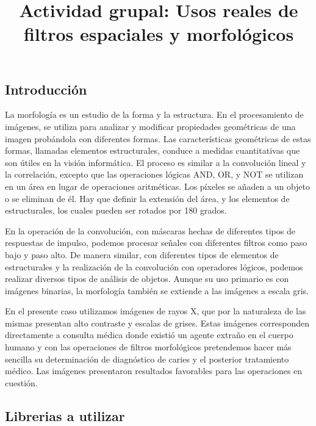 \documentclass[11pt,a4paper,table]{article}
\title{Actividad grupal: Usos reales de filtros espaciales y morfológicos}
\makeatletter
\let\newtitle\@title
\makeatother
\begin{document}
    
    
    
    
    \hypertarget{actividad-grupal-usos-reales-de-filtros-espaciales-y-morfoluxf3gicos}{%
\textcolor{UnirDark}{\Large\bfseries\newtitle}\label{actividad-grupal-usos-reales-de-filtros-espaciales-y-morfoluxf3gicos}}

\hypertarget{introducciuxf3n}{%
\subsection*{Introducción}\label{introducciuxf3n}}

La morfología es un estudio de la forma y la estructura. En el
procesamiento de imágenes, se utiliza para analizar y modificar
propiedades geométricas de una imagen probándola con diferentes formas.
Las características geométricas de estas formas, llamadas elementos
estructurales, conduce a medidas cuantitativas que son útiles en la
visión informática. El proceso es similar a la convolución lineal y la
correlación, excepto que las operaciones lógicas AND, OR, y NOT se
utilizan en un área en lugar de operaciones aritméticas. Los píxeles se
añaden a un objeto o se eliminan de él. Hay que definir la extensión del
área, y los elementos de estructurales, los cuales pueden ser rotados
por 180 grados.\cite{Sundararajan_2017}

En la operación de la convolución, con máscaras hechas de diferentes
tipos de respuestas de impulso, podemos procesar señales con diferentes
filtros como paso bajo y paso alto. De manera similar, con diferentes
tipos de elementos de estructurales y la realización de la convolución
con operadores lógicos, podemos realizar diversos tipos de análisis de
objetos. Aunque su uso primario es con imágenes binarias, la morfología
también se extiende a las imágenes a escala gris.\cite{Sundararajan_2017}

En el presente caso utilizamos imágenes de rayos X, que por la
naturaleza de las mismas presentan alto contraste y escalas de grises.
Estas imágenes corresponden directamente a consulta médica donde existió
un agente extraño en el cuerpo humano y con las operaciones de filtros
morfológicos pretendemos hacer más sencilla su determinación de
diagnóstico de caries y el posterior tratamiento médico. Las imágenes
presentaron resultados favorables para las operaciones en cuestión.

    \hypertarget{librerias-a-utilizar}{%
\subsection*{Librerias a utilizar}\label{librerias-a-utilizar}}
\end{document}
